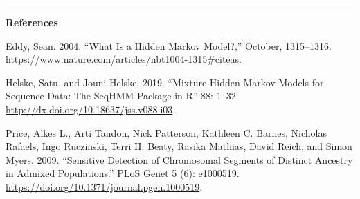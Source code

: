 \documentclass[
]{book}
\begin{document}
\begin{center}\rule{0.5\linewidth}{0.5pt}\end{center}

\textbf{References}

Eddy, Sean. 2004. ``What Is a Hidden Markov Model?,'' October, 1315--1316. \url{https://www.nature.com/articles/nbt1004-1315\#citeas}.

Helske, Satu, and Jouni Helske. 2019. ``Mixture Hidden Markov Models for Sequence Data: The SeqHMM Package in R'' 88: 1--32. \url{http://dx.doi.org/10.18637/jss.v088.i03}.

Price, Alkes L., Arti Tandon, Nick Patterson, Kathleen C. Barnes, Nicholas Rafaels, Ingo Ruczinski, Terri H. Beaty, Rasika Mathias, David Reich, and Simon Myers. 2009. ``Sensitive Detection of Chromosomal Segments of Distinct Ancestry in Admixed Populations.'' PLoS Genet 5 (6): e1000519. \url{https://doi.org/10.1371/journal.pgen.1000519}.

\hfill\break

  
\end{document}
